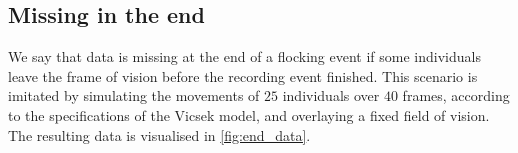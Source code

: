 %
%
%

\subsection{Missing in the end}

We say that data is missing at the end of a flocking event if some individuals
leave the frame of vision before the recording event finished. This scenario is
imitated by simulating the movements of $25$ individuals over $40$ frames,
according to the specifications of the Vicsek model, and overlaying a fixed
field of vision. The resulting data is visualised in \cref{fig:end_data}.

